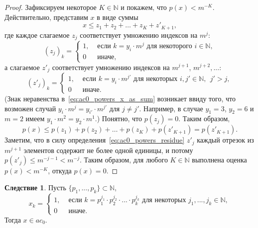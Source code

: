 \documentclass[a4paper,openbib]{article}
\renewcommand{\leq}{\leqslant}
\theoremstyle{definition}
\newtheorem{corollary}[lemma]{Следствие}
\begin{document}
\begin{proof}
	Зафиксируем некоторое $K \in \mathbb{N}$ и покажем, что $p(x) < m^{-K}$.
	Действительно, представим $x$ в виде суммы
	\begin{equation}
		\label{eq:ac0_powers_x_as_sum}
		x \leq z_1 + z_2 + \dots + z_K + z'_{K+1}
		,
	\end{equation}
	где каждое слагаемое $z_j$ соответствует умножению индексов на $m^j$:
	\begin{equation}
		(z_j)_k = \begin{cases}
			1, &\mbox{~если~} k = y_i \cdot m^j \mbox{~для некоторого~} i\in\mathbb{N},
			\\
			0  &\mbox{~иначе}
			,
		\end{cases}
	\end{equation}
	а слагаемое $z'_j$ соответствует умножению индексов на $m^{j+1}$, $m^{j+2},...$:
	\begin{equation}
		\label{eq:ac0_powers_residue}
		(z'_j)_k = \begin{cases}
			1, &\mbox{~если~} k = y_i \cdot m^{j'} \mbox{~для некоторых~} i,j'\in\mathbb{N},~~ j' > j
			,%
			\\
			0  &\mbox{~иначе}
			.
		\end{cases}
	\end{equation}
	(Знак неравенства в~\eqref{eq:ac0_powers_x_as_sum} возникает ввиду того, что возможен случай
	$y_i \cdot m^j = y_{i'} \cdot m^{j'}$ для $j\neq j'$.
	Например, в случае $y_1 = 3$, $y_2 = 6$ и $m=2$ имеем $y_1 \cdot m^2 = y_2 \cdot m^1$.)
	Понятно, что $p(z_j)=0$.
	Таким образом,
	\begin{equation}
		p(x) \leq p(z_1) + p(z_2) + \dots + p(z_K) + p(z'_{K+1}) = p(z'_{K+1})
		.
	\end{equation}
	Заметим, что в силу определения~\eqref{eq:ac0_powers_residue} $z'_j$ каждый отрезок из $m^{j+1}$ элементов
	содержит не более одной единицы, и потому $p(z'_j) \leq m^{-j-1} < m^{-j}$.
	Таким образом, для любого $K\in\mathbb{N}$ выполнена оценка $p(x) < m^{-K}$,
	откуда $p(x) = 0$.
\end{proof}

\begin{corollary}
	\label{cor:ac0_powers_finite_set_of_numbers}
	Пусть $\{p_1, ..., p_k\} \subset \mathbb{N}$,
	\begin{equation}
		x_k = \begin{cases}
			1, &\mbox{~если~} k = p_1^{j_1}\cdot p_2^{j_2}\cdot ... \cdot p_k^{j_k} \mbox{~для некоторых~} j_1,...,j_k\in\mathbb{N},
			\\
			0  &\mbox{~иначе}.
		\end{cases}
	\end{equation}
	Тогда $x\in ac_0$.
\end{corollary}
\end{document}
